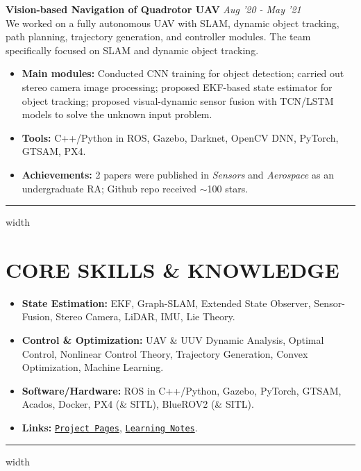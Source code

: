 \documentclass[overlapped]{res}
\newcommand{\pink}[1]{\textcolor{pink!40!red}{#1}} %
\begin{document}
\begin{resume}

\textbf{Vision-based Navigation of Quadrotor UAV} 
\hfill \textit{Aug '20 - May  '21} \\
We worked on a fully autonomous UAV with SLAM, dynamic object tracking, path planning, trajectory generation, and controller modules. The team specifically focused on SLAM and dynamic object tracking.

\begin{itemize}
  \item \textbf{Main modules:} Conducted CNN training for object detection; carried out stereo camera image processing; proposed EKF-based state estimator for object tracking; proposed visual-dynamic sensor fusion with TCN/LSTM models to solve the unknown input problem.
  \item \textbf{Tools:} C++/Python in ROS, Gazebo, Darknet, OpenCV DNN, PyTorch, GTSAM, PX4.
  \item \textbf{Achievements:} 2 papers were published in \textit{Sensors} and \textit{Aerospace} as an undergraduate RA; Github repo received $\sim$100 stars.
\end{itemize}
\par\noindent\hrule width \linewidth %

\section{CORE SKILLS \& KNOWLEDGE}
\begin{itemize}
  \item \textbf{State Estimation:} EKF, Graph-SLAM, Extended State Observer, Sensor-Fusion, Stereo Camera, LiDAR, IMU, Lie Theory.
  \item \textbf{Control \& Optimization:} UAV \& UUV Dynamic Analysis, Optimal Control, Nonlinear Control Theory, Trajectory Generation, Convex Optimization, Machine Learning. 
  \item \textbf{Software/Hardware:} ROS in C++/Python, Gazebo, PyTorch, GTSAM, Acados, Docker, PX4 (\& SITL), BlueROV2 (\& SITL).
  \item \textbf{Links:} \pink{{\texttt{\href{https://pattylo.github.io/projects/}{Project Pages}}}}, \pink{{\texttt{\href{https://pattylo.github.io/learning/}{Learning Notes}}}}.
\end{itemize}
\par\noindent\hrule width \linewidth %


\end{resume}
\end{document}
